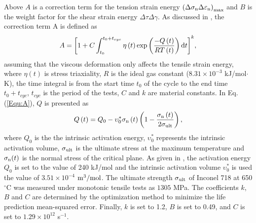 \documentclass[preprint,5p,twocolumn,11pt,sort&compress]{elsarticle}
\begin{document}
Above $A$ is a correction term for the tension strain energy ${{\left( {\Delta {\sigma _{\rm n}}\Delta {\varepsilon _{\rm n}}} \right)}_{\max }}$ and $B$ is the weight factor for the shear strain energy ${\Delta \tau \Delta \gamma }$.
As discussed in \cite{Vose2013}, the correction term A is defined as
\begin{equation}
A = {\left[ {1 + C\int_{{t_0}}^{{t_0} + {t_{cyc}}} {\eta \left( t \right)\exp \left( {\frac{{ - Q\left( t \right)}}{{RT\left( t \right)}}} \right){\rm{d}}t} } \right]^k},
\label{Equ:A}
\end{equation}
assuming that the viscous deformation only affects the tensile strain energy, where $\eta \left( t \right)$ is stress triaxiality, $R$ is the ideal gas constant ($8.31\times10^{-3}$ kJ/mol$\cdot$K), the time integral is from the start time $t_0$ of the cycle to the end time $t_0 + t_{cyc}$, $t_{cyc}$ is the period of the tests, $C$ and $k$ are material constants.
In Eq. (\ref{Equ:A}), $Q$ is presented \cite{Warren2006,Warren2008} as
\begin{equation}
Q\left( t \right) = {Q_0} - \upsilon _0^*{\sigma _{\rm n}}\left( t \right)\left( {1 - \frac{{{\sigma _{\rm n}}\left( t \right)}}{{2{\sigma _{\rm ult}}}}} \right),
\label{Equ:creep_activation_energy}
\end{equation}
where $Q_0$ is the the intrinsic activation energy, $\upsilon _0^*$ represents the intrinsic activation volume, $\sigma_{\rm ult}$ is the ultimate stress at the maximum temperature and $\sigma_{\rm n}(t)$ is the normal stress of the critical plane.
As given in \cite{Warren2008}, the activation energy $Q_0$ is set to the value of 240 kJ/mol and the intrinsic activation volume $\upsilon _0^*$ is used the value of $3.51\times10^{-4}$ $\rm{m}^{3}/\rm{mol}$. The ultimate strength $\sigma_{\rm ult}$ of Inconel 718 at 650$^\circ$C was measured under monotonic tensile tests as $1305$ MPa. The coefficients $k$, $B$ and $C$ are determined by the optimization method to minimize the life prediction mean-squared error. Finally, $k$ is set to 1.2, $B$ is set to 0.49, and $C$ is set to $1.29\times10^{12}$ s$^{-1}$.



\end{document}
